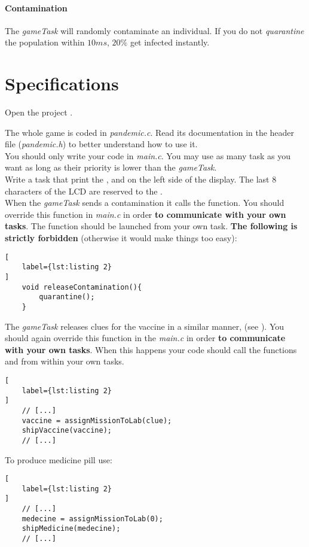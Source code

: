 \paragraph{Contamination}
The \textit{gameTask} will randomly contaminate an individual.
If you do not \textit{quarantine} the population within $ 10ms $, $ 20\% $ get infected instantly.

\section*{Specifications}
Open the project .

The whole game is coded in \textit{pandemic.c}.
Read its documentation in the header file (\textit{pandemic.h}) to better understand how to use it.\\

You should only write your code in \textit{main.c}.
You may use as many task as you want as long as their priority is lower than the \textit{gameTask}.\\

Write a task that print the ,  and  on the left side of the display.
The last 8 characters of the LCD are reserved to the .\\

When the \textit{gameTask} sends a contamination it calls the  function.
You should override this function in \textit{main.c} in order \textbf{to communicate with your own tasks}.
The  function should be launched from your own task.
\textbf{The following is strictly forbidden} (otherwise it would make things too easy):
\begin{lstlisting}[
	label={lst:listing 2}
]
	void releaseContamination(){
	    quarantine();
	}
\end{lstlisting}


The \textit{gameTask} releases clues for the vaccine in a similar manner, (see ). You should again override this function in the \textit{main.c} in order \textbf{to communicate with your own tasks}. 
When this happens your code should call the functions  and  from within your own tasks.
\begin{lstlisting}[
	label={lst:listing 2}
]
	// [...]
	vaccine = assignMissionToLab(clue);
	shipVaccine(vaccine);
	// [...]
\end{lstlisting}

To produce medicine pill use:
\begin{lstlisting}[
	label={lst:listing 2}
]
	// [...]
	medecine = assignMissionToLab(0);
	shipMedicine(medecine);
	// [...]
\end{lstlisting}

